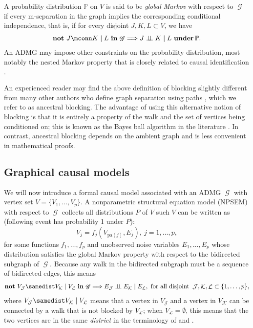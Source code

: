 \documentclass[12pt,a4paper]{article}
\theoremstyle{definition}
\newcommand{\PP}[0]{\mathbb{P}}
\newcommand{\pa}[0]{\text{pa}}
\newcommand{\indep}{\perp \!\!\! \perp}
\newcommand{\ingraph}[1]{~\textnormal{\bf in}\,#1}
\newcommand{\textnot}{\textnormal{\bf not}~}
\newcommand{\underdist}[1]{~\textnormal{\bf under}\,#1}
\DeclareMathOperator{\gG}{\mathscr{G}}
\DeclareMathOperator{\sJ}{\mathcal{J}}
\DeclareMathOperator{\sK}{\mathcal{K}}
\DeclareMathOperator{\sL}{\mathcal{L}}
\begin{document}
A probability distribution $\PP$ on $V$ is said to be \emph{global
  Markov} with respect to $\gG$ if every m-separation in the graph
implies the corresponding conditional independence, that is, if for
every disjoint $J,K,L \subset V$, we have
\[
  \textnot J \mconn K \mid L \ingraph{\gG} \Longrightarrow J \indep K
  \mid L \underdist{\PP}.
\]
An ADMG may impose other constraints on the probability distribution,
most notably the nested Markov property that is closely related to
causal identification \parencite{richardson_nested_2023}.

An experienced reader may find the above definition of blocking
slightly different from many other authors who define graph separation
using paths \parencite{lauritzen_graphical_1996, pearl2009}, which we
refer to as ancestral blocking. The advantage
of using this alternative notion of blocking is that it is entirely a
property of the walk and the set of vertices being conditioned
on; this is known as the Bayes ball algorithm in the literature
\parencite{shachterBayesballRationalPastime1998}. In contrast,
ancestral blocking depends on
the ambient graph and is less convenient in mathematical proofs. %


\subsection{Graphical causal models}
We will now introduce a formal causal model associated with an ADMG
$\gG$ with vertex set $V = \{V_1,\dots,V_p\}$. A nonparametric
structural equation model (NPSEM) with respect to $\gG$ collects all
distributions $P$ of $V$ such $V$ can be written as (following event
has probability 1 under $P$):
\begin{equation} \label{eq:npsem}
  V_j = f_j(V_{\pa(j)}, E_j), ~ j = 1,\dots,p,
\end{equation}
for some functions $f_1,\dots,f_p$ and unobserved noise variables
$E_1,\dots,E_p$ whose distribution satisfies the global Markov
property with respect to the bidirected subgraph of $\gG$. Because any
walk in the bidirected subgraph must be a sequence of bidirected
edges, this means
\[
  \textnot V_{\sJ} \samedist V_{\sK} \mid V_{\sL} \ingraph{\gG}
  \Longrightarrow E_{\sJ} \indep E_{\sK} \mid E_{\sL},~\text{for all
    disjoint}~\sJ, \sK, \sL \subset \{1,\dots,p\},
\]
where $V_{\sJ} \samedist V_{\sK} \mid V_{\sL}$ means that a vertex in
$V_{\sJ}$ and a vertex in $V_{\sK}$ can be connected by a walk that is
not blocked by $V_{\sL}$; when
$V_{\sL} = \emptyset$, this means that the two vertices are in the
same \emph{district} in the terminology of
\textcite{richardson_markov_2003} and \textcite{richardson_nested_2023}.
\end{document}
